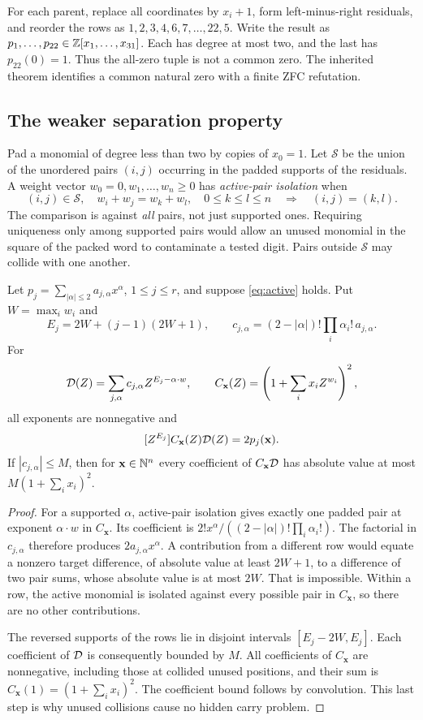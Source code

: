 For each parent, replace all coordinates by $x_i+1$, form left-minus-right
residuals, and reorder the rows as
$1,2,3,4,6,7,\ldots,22,5$. Write the result as
$p_1,\ldots,p_{22}\in\mathbb Z[x_1,\ldots,x_{31}]$. Each has degree at most two,
and the last has $p_{22}(0)=1$. Thus the all-zero tuple is not a common
zero. The inherited theorem identifies a common natural zero with a
finite ZFC refutation.

\subsection{The weaker separation property}
Pad a monomial of degree less than two by copies of $x_0=1$.
Let $\mathcal S$ be the union of the unordered pairs $(i,j)$ occurring
in the padded supports of the residuals. A weight vector
$w_0=0,w_1,\ldots,w_n\ge0$ has \emph{active-pair isolation} when
\begin{equation}\label{eq:active}
 (i,j)\in\mathcal S,\quad w_i+w_j=w_k+w_l,
 \quad 0\le k\le l\le n
 \quad\Longrightarrow\quad (i,j)=(k,l).
\end{equation}
The comparison is against \emph{all} pairs, not just supported ones.
Requiring uniqueness only among supported pairs would allow an unused
monomial in the square of the packed word to contaminate a tested digit.
Pairs outside $\mathcal S$ may collide with one another.

\begin{theorem}\label{thm:extract}
Let $p_j=\sum_{|\alpha|\le2}a_{j,\alpha}x^\alpha$, $1\le j\le r$,
and suppose \eqref{eq:active} holds. Put $W=\max_iw_i$ and
\[
 E_j=2W+(j-1)(2W+1),\qquad
 c_{j,\alpha}=(2-|\alpha|)!\prod_i\alpha_i!\,a_{j,\alpha}.
\]
For
\[
 \mathcal D(Z)=\sum_{j,\alpha}c_{j,\alpha}Z^{E_j-\alpha\cdot w},
 \qquad C_{\mathbf x}(Z)=\left(1+\sum_i x_iZ^{w_i}\right)^2,
\]
all exponents are nonnegative and
\[
 [Z^{E_j}]C_{\mathbf x}(Z)\mathcal D(Z)=2p_j(\mathbf x).
\]
If $|c_{j,\alpha}|\le M$, then for $\mathbf x\in\mathbb N^n$ every coefficient
of $C_{\mathbf x}\mathcal D$ has absolute value at most
$M(1+\sum_i x_i)^2$.
\end{theorem}
\begin{proof}
For a supported $\alpha$, active-pair isolation gives exactly one padded
pair at exponent $\alpha\cdot w$ in $C_{\mathbf x}$. Its coefficient is
$2!x^\alpha/((2-|\alpha|)!\prod_i\alpha_i!)$. The factorial in
$c_{j,\alpha}$ therefore produces $2a_{j,\alpha}x^\alpha$.
A contribution from a different row would equate a nonzero target
difference, of absolute value at least $2W+1$, to a difference of two
pair sums, whose absolute value is at most $2W$. That is impossible.
Within a row, the active monomial is isolated against every possible
pair in $C_{\mathbf x}$, so there are no other contributions.

The reversed supports of the rows lie in disjoint intervals
$[E_j-2W,E_j]$. Each coefficient of $\mathcal D$ is consequently bounded by
$M$. All coefficients of $C_{\mathbf x}$ are nonnegative, including
those at collided unused positions, and their sum is
$C_{\mathbf x}(1)=(1+\sum_i x_i)^2$. The coefficient bound follows by
convolution. This last step is why unused collisions cause no hidden
carry problem.
\end{proof}

